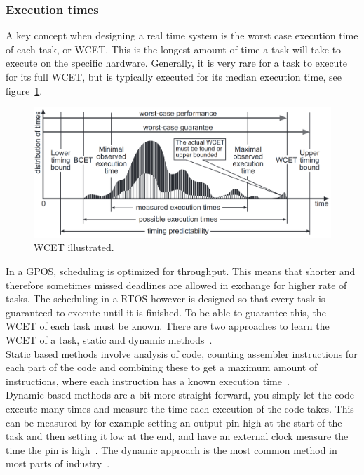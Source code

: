 
\subsubsection{Execution times}
A key concept when designing a real time system is the worst case execution time of each task, or WCET. This is the longest amount of time a task will take to execute on the specific hardware. Generally, it is very rare for a task to execute for its full WCET, but is typically executed for its median execution time, see figure~\ref{fig:wcet}.

\begin{figure}[H]
\centering
\includegraphics[width=\textwidth]{./img/literature_wcet.png}
\caption{WCET illustrated.~\cite{wcet}}\label{fig:wcet}
\end{figure}

In a GPOS, scheduling is optimized for throughput. This means that shorter and therefore sometimes missed deadlines are allowed in exchange for higher rate of tasks. The scheduling in a RTOS however is designed so that every task is guaranteed to execute until it is finished. To be able to guarantee this, the WCET of each task must be known. There are two approaches to learn the WCET of a task, static and dynamic methods~\cite{wcet}.\\

Static based methods involve analysis of code, counting assembler instructions for each part of the code and combining these to get a maximum amount of instructions, where each instruction has  a known execution time~\cite{wcet}.\\

Dynamic based methods are a bit more straight-forward, you simply let the code execute many times and measure the time each execution of the code takes. This can be measured by for example setting an output pin high at the start of the task and then setting it low at the end, and have an external clock measure the time the pin is high~\cite{wcet}. The dynamic approach is the most common method in most parts of industry~\cite{wcet}.

